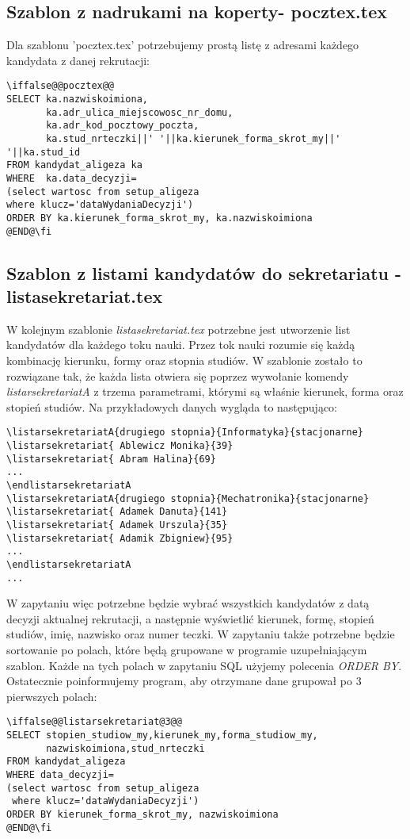 \subsection*{Szablon z nadrukami na koperty- pocztex.tex}
Dla szablonu 'pocztex.tex' potrzebujemy prostą listę z adresami każdego kandydata z danej rekrutacji:


 \begin{lstlisting}
\iffalse@@pocztex@@
SELECT ka.nazwiskoimiona,
       ka.adr_ulica_miejscowosc_nr_domu,
	   ka.adr_kod_pocztowy_poczta,
	   ka.stud_nrteczki||' '||ka.kierunek_forma_skrot_my||' '||ka.stud_id	   
FROM kandydat_aligeza ka 
WHERE  ka.data_decyzji=
(select wartosc from setup_aligeza 
where klucz='dataWydaniaDecyzji')
ORDER BY ka.kierunek_forma_skrot_my, ka.nazwiskoimiona
@END@\fi
\end{lstlisting}

\subsection*{Szablon z listami kandydatów do sekretariatu - listasekretariat.tex}
W kolejnym szablonie \emph{listasekretariat.tex} potrzebne jest utworzenie list kandydatów dla każdego toku nauki. Przez tok nauki rozumie się każdą kombinację kierunku, formy oraz stopnia studiów. W szablonie zostało to rozwiązane tak, że każda lista otwiera się poprzez wywołanie komendy \emph{listarsekretariatA} z trzema parametrami, którymi są właśnie kierunek, forma oraz stopień studiów. Na przykładowych danych wygląda to następująco:
 \begin{lstlisting}
\listarsekretariatA{drugiego stopnia}{Informatyka}{stacjonarne}
\listarsekretariat{ Ablewicz Monika}{39}
\listarsekretariat{ Abram Halina}{69}
...
\endlistarsekretariatA
\listarsekretariatA{drugiego stopnia}{Mechatronika}{stacjonarne}
\listarsekretariat{ Adamek Danuta}{141}
\listarsekretariat{ Adamek Urszula}{35}
\listarsekretariat{ Adamik Zbigniew}{95}
...
\endlistarsekretariatA
...
\end{lstlisting}

W zapytaniu więc potrzebne będzie wybrać wszystkich kandydatów z datą decyzji aktualnej rekrutacji, a następnie wyświetlić kierunek, formę, stopień studiów, imię, nazwisko oraz numer teczki. W zapytaniu także potrzebne będzie sortowanie po polach, które będą grupowane w programie uzupełniającym szablon. Każde na tych polach w zapytaniu SQL użyjemy polecenia \emph{ORDER BY}. Ostatecznie poinformujemy program, aby otrzymane dane grupował po 3 pierwszych polach:
 \begin{lstlisting}
\iffalse@@listarsekretariat@3@@
SELECT stopien_studiow_my,kierunek_my,forma_studiow_my,
       nazwiskoimiona,stud_nrteczki
FROM kandydat_aligeza
WHERE data_decyzji=
(select wartosc from setup_aligeza
 where klucz='dataWydaniaDecyzji')
ORDER BY kierunek_forma_skrot_my, nazwiskoimiona
@END@\fi
\end{lstlisting}

